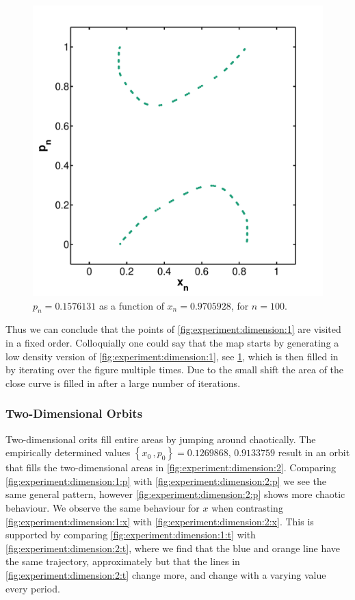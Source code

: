 \begin{figure}
	\centering
	\includegraphics[width=0.9\columnwidth]{./img/assignment_a_1_dim_n100}
	\caption{$p_n = \num{0.1576131}$ as a function of $x_n= \num{0.9705928}$, for $n = 100$.}
	\label{fig:experiment:a_1_n100}
\end{figure}



Thus we can conclude that the points of \cref{fig:experiment:dimension:1} are visited in a fixed order. Colloquially one could say that the map starts by generating a low density version of \cref{fig:experiment:dimension:1}, see \cref{fig:experiment:a_1_n100}, which is then filled in by iterating over the figure multiple times. Due to the small shift the area of the close curve is filled in after a large number of iterations.

\subsubsection{Two-Dimensional Orbits}	
\label{sss:experiment:a:2D}
	Two-dimensional orits fill entire areas by jumping around chaotically. The empirically determined values $\left\{x_0\,, p_0 \right\} = {\num{0.1269868},\,\num{0.9133759}}$ result in an orbit that fills the two-dimensional areas in \cref{fig:experiment:dimension:2}. Comparing \cref{fig:experiment:dimension:1:p} with \cref{fig:experiment:dimension:2:p} we see the same general pattern, however \cref{fig:experiment:dimension:2:p} shows more chaotic behaviour. We observe the same behaviour for $x$ when contrasting \cref{fig:experiment:dimension:1:x} with \cref{fig:experiment:dimension:2:x}. This is supported by comparing \cref{fig:experiment:dimension:1:t} with \cref{fig:experiment:dimension:2:t}, where we find that the blue and orange line have the same trajectory, approximately but that the lines in \cref{fig:experiment:dimension:2:t} change more, and change with a varying value every period.

